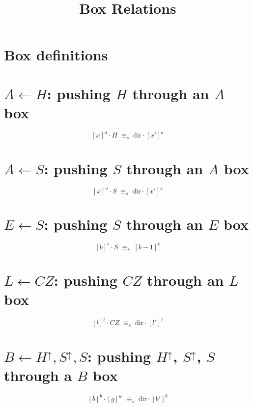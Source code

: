 \documentclass[a4paper]{article}
\title{Box Relations}
\date{}
\begin{document}
\maketitle

\section*{Box definitions}

\section*{$A \leftarrow H$: pushing $H$ through an $A$ box}
\[ [x]^a \cdot H \;\equiv_s\; \mathrm{dir} \cdot [x']^a \]

\section*{$A \leftarrow S$: pushing $S$ through an $A$ box}
\[ [x]^a \cdot S \;\equiv_s\; \mathrm{dir} \cdot [x']^a \]

\section*{$E \leftarrow S$: pushing $S$ through an $E$ box}
\[ [b]^e \cdot S \;\equiv_s\; [b-1]^e \]

\section*{$L \leftarrow CZ$: pushing $CZ$ through an $L$ box}
\[ [l]^\ell \cdot CZ \;\equiv_s\; \mathrm{dir} \cdot [l']^\ell \]

\section*{$B \leftarrow H^\uparrow, S^\uparrow, S$: pushing $H^\uparrow$, $S^\uparrow$, $S$ through a $B$ box}
\[ [b]^b \cdot [g]^w \;\equiv_s\; \mathrm{dir} \cdot [b']^b \]
\end{document}
